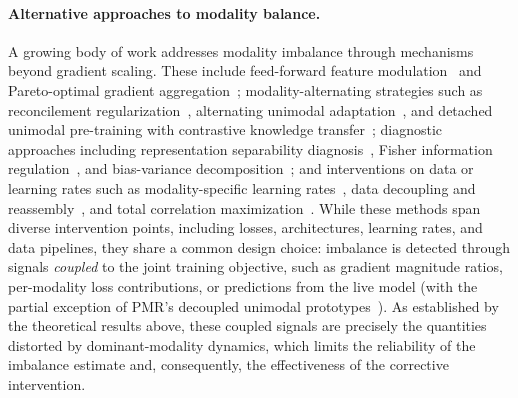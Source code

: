 \documentclass{article}
\begin{document}
\paragraph{Alternative approaches to modality balance.}

A growing body of work addresses modality imbalance through mechanisms beyond gradient scaling. These include feed-forward feature modulation~\citep{wei2024opm} and Pareto-optimal gradient aggregation~\citep{wei2024mmpareto}; modality-alternating strategies such as reconcilement regularization~\citep{hua2024reconboost}, alternating unimodal adaptation~\citep{zhang2024mla}, and detached unimodal pre-training with contrastive knowledge transfer~\citep{fan2024dimml}; diagnostic approaches including representation separability diagnosis~\citep{wei2024dr}, Fisher information regulation~\citep{huang2025inforeg}, and bias-variance decomposition~\citep{wei2025arl}; and interventions on data or learning rates such as modality-specific learning rates~\citep{yao2022mslr}, data decoupling and reassembly~\citep{ma2025remixing}, and total correlation maximization~\citep{yu2026tcmax}. While these methods span diverse intervention points, including losses, architectures, learning rates, and data pipelines, they share a common design choice: imbalance is detected through signals \emph{coupled} to the joint training objective, such as gradient magnitude ratios, per-modality loss contributions, or predictions from the live model (with the partial exception of PMR's decoupled unimodal prototypes~\citep{fan2023pmr}). As established by the theoretical results above, these coupled signals are precisely the quantities distorted by dominant-modality dynamics, which limits the reliability of the imbalance estimate and, consequently, the effectiveness of the corrective intervention.
\end{document}
